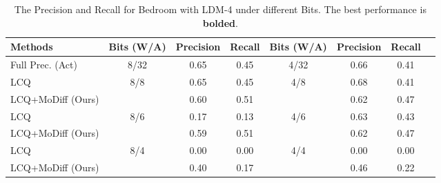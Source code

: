 \begin{table}[!ht]
\small
\centering
\caption{The Precision and Recall for Bedroom with LDM-4 under different Bits. The best performance is \textbf{bolded}.}
\begin{tabular}{l|c|cc||c|ccc}
\toprule
{Methods} & {Bits (W/A)} & Precision & Recall & {Bits (W/A)} & Precision  & Recall & \\
\midrule
Full Prec. (Act) & 8/32 & 0.65 & 0.45 & 4/32 & 0.66 & 0.41 \\
\midrule
LCQ &\multirow{2}{*}{8/8} & 0.65 & 0.45 &\multirow{2}{*}{4/8} & 0.68 & 0.41 & \\
LCQ+MoDiff (Ours) & & 0.60 & 0.51 & & 0.62 & 0.47 & \\
\midrule
LCQ &\multirow{2}{*}{8/6} & 0.17 & 0.13 &\multirow{2}{*}{4/6} & 0.63 & 0.43 & \\
LCQ+MoDiff (Ours) & & 0.59 & 0.51 & & 0.62 & 0.47 & \\
\midrule
LCQ &\multirow{2}{*}{8/4} & 0.00 & 0.00 &\multirow{2}{*}{4/4} & 0.00 & 0.00 & \\
LCQ+MoDiff (Ours) & & 0.40 & 0.17 & & 0.46 & 0.22 & \\
\bottomrule
\end{tabular}
\label{tab:bedroom_pr}
\end{table}

